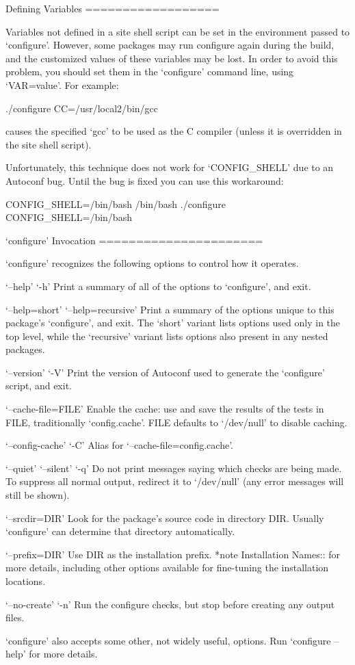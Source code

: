 \begin{DoxyCodeInclude}
Defining Variables
==================

   Variables not defined in a site shell script can be set in the
environment passed to `configure'.  However, some packages may run
configure again during the build, and the customized values of these
variables may be lost.  In order to avoid this problem, you should set
them in the `configure' command line, using `VAR=value'.  For example:

     ./configure CC=/usr/local2/bin/gcc

causes the specified `gcc' to be used as the C compiler (unless it is
overridden in the site shell script).

Unfortunately, this technique does not work for `CONFIG_SHELL' due to
an Autoconf bug.  Until the bug is fixed you can use this workaround:

     CONFIG_SHELL=/bin/bash /bin/bash ./configure CONFIG_SHELL=/bin/bash

`configure' Invocation
======================

   `configure' recognizes the following options to control how it
operates.

`--help'
`-h'
     Print a summary of all of the options to `configure', and exit.

`--help=short'
`--help=recursive'
     Print a summary of the options unique to this package's
     `configure', and exit.  The `short' variant lists options used
     only in the top level, while the `recursive' variant lists options
     also present in any nested packages.

`--version'
`-V'
     Print the version of Autoconf used to generate the `configure'
     script, and exit.

`--cache-file=FILE'
     Enable the cache: use and save the results of the tests in FILE,
     traditionally `config.cache'.  FILE defaults to `/dev/null' to
     disable caching.

`--config-cache'
`-C'
     Alias for `--cache-file=config.cache'.

`--quiet'
`--silent'
`-q'
     Do not print messages saying which checks are being made.  To
     suppress all normal output, redirect it to `/dev/null' (any error
     messages will still be shown).

`--srcdir=DIR'
     Look for the package's source code in directory DIR.  Usually
     `configure' can determine that directory automatically.

`--prefix=DIR'
     Use DIR as the installation prefix.  *note Installation Names::
     for more details, including other options available for fine-tuning
     the installation locations.

`--no-create'
`-n'
     Run the configure checks, but stop before creating any output
     files.

`configure' also accepts some other, not widely useful, options.  Run
`configure --help' for more details.

\end{DoxyCodeInclude}
 